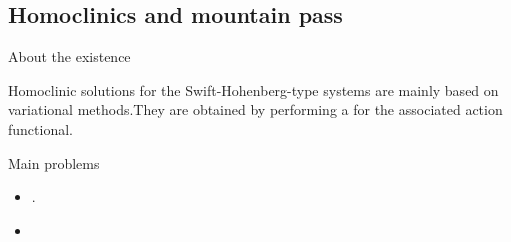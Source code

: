 \documentclass[9pt, english]{beamer}
\theoremstyle{definition}
\begin{document}
\subsection{Homoclinics and mountain pass}
\begin{frame}{About the existence}
    \begin{block}{Homoclinic solutions}
        for the Swift-Hohenberg-type systems are mainly based on  variational
        methods.\pause They are obtained by performing a
        {\color{magenta}{mountain-pass procedure}\/} for the associated action functional.
    \end{block}
    \pause
    \begin{block}{Main problems}\pause
        \begin{itemize}
        \item {\color{red}{Failure of the Palais-Smale condition}.\/}\pause
        \item {\color{red}{The functional is unbounded both from above and
        below.}\/}
        \end{itemize}
    \end{block}
\end{frame}
\end{document}
